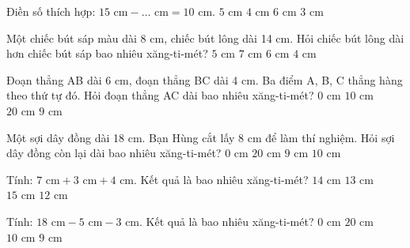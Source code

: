 \begin{ex} %
Điền số thích hợp: $15\text{ cm} - \dots\text{ cm} = 10\text{ cm}$.
\choice
{\True $5\text{ cm}$}
{$4\text{ cm}$}
{$6\text{ cm}$}
{$3\text{ cm}$}
\end{ex}

\begin{ex} %
Một chiếc bút sáp màu dài 8 cm, chiếc bút lông dài 14 cm. Hỏi chiếc bút lông dài hơn chiếc bút sáp bao nhiêu xăng-ti-mét?
\choice
{$5\text{ cm}$}
{$7\text{ cm}$}
{\True $6\text{ cm}$}
{$4\text{ cm}$}
\end{ex}

\begin{ex} %
Đoạn thẳng AB dài 6 cm, đoạn thẳng BC dài 4 cm. Ba điểm A, B, C thẳng hàng theo thứ tự đó. Hỏi đoạn thẳng AC dài bao nhiêu xăng-ti-mét?
\choice
{$0\text{ cm}$}
{\True $10\text{ cm}$}
{$20\text{ cm}$}
{$9\text{ cm}$}
\end{ex}

\begin{ex} %
Một sợi dây đồng dài 18 cm. Bạn Hùng cắt lấy 8 cm để làm thí nghiệm. Hỏi sợi dây đồng còn lại dài bao nhiêu xăng-ti-mét?
\choice
{$0\text{ cm}$}
{$20\text{ cm}$}
{$9\text{ cm}$}
{\True $10\text{ cm}$}
\end{ex}

\begin{ex} %
Tính: $7\text{ cm} + 3\text{ cm} + 4\text{ cm}$. Kết quả là bao nhiêu xăng-ti-mét?
\choice
{\True $14\text{ cm}$}
{$13\text{ cm}$}
{$15\text{ cm}$}
{$12\text{ cm}$}
\end{ex}

\begin{ex} %
Tính: $18\text{ cm} - 5\text{ cm} - 3\text{ cm}$. Kết quả là bao nhiêu xăng-ti-mét?
\choice
{$0\text{ cm}$}
{$20\text{ cm}$}
{\True $10\text{ cm}$}
{$9\text{ cm}$}
\end{ex}

